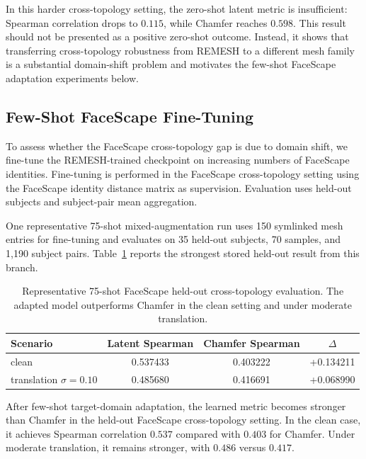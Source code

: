 \documentclass{article}
\begin{document}
In this harder cross-topology setting, the zero-shot latent metric is
insufficient: Spearman correlation drops to $0.115$, while Chamfer reaches
$0.598$. This result should not be presented as a positive zero-shot outcome.
Instead, it shows that transferring cross-topology robustness from REMESH to a
different mesh family is a substantial domain-shift problem and motivates the
few-shot FaceScape adaptation experiments below.

\subsection{Few-Shot FaceScape Fine-Tuning}
\label{app:faceverse_finetuning}

To assess whether the FaceScape cross-topology gap is due to domain shift, we
fine-tune the REMESH-trained checkpoint on increasing numbers of FaceScape
identities. Fine-tuning is performed in the FaceScape cross-topology setting
using the FaceScape identity distance matrix as supervision. Evaluation uses
held-out subjects and subject-pair mean aggregation.

One representative 75-shot mixed-augmentation run uses 150 symlinked mesh
entries for fine-tuning and evaluates on 35 held-out subjects, 70 samples, and
1,190 subject pairs. Table~\ref{tab:faceverse_75shot_app} reports the strongest
stored held-out result from this branch.

\begin{table}[h]
\centering
\small
\caption{
Representative 75-shot FaceScape held-out cross-topology evaluation. The adapted
model outperforms Chamfer in the clean setting and under moderate translation.
}
\label{tab:faceverse_75shot_app}
\begin{tabular}{lccc}
\toprule
Scenario & Latent Spearman & Chamfer Spearman & $\Delta$ \\
\midrule
clean & 0.537433 & 0.403222 & +0.134211 \\
translation $\sigma=0.10$ & 0.485680 & 0.416691 & +0.068990 \\
\bottomrule
\end{tabular}
\end{table}

After few-shot target-domain adaptation, the learned metric becomes stronger than
Chamfer in the held-out FaceScape cross-topology setting. In the clean case, it
achieves Spearman correlation $0.537$ compared with $0.403$ for Chamfer. Under
moderate translation, it remains stronger, with $0.486$ versus $0.417$.
\end{document}
